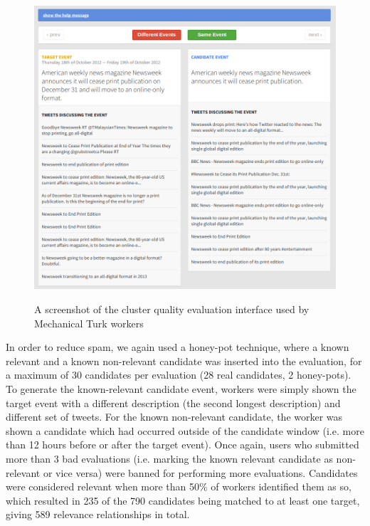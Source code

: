 \begin{figure}[t]
	{\includegraphics[width=\textwidth]{./Chapters/Collection/images/cluster_eval}}
	\caption{A screenshot of the cluster quality evaluation interface used by Mechanical Turk workers}
	\label{fig:clusteringscreenshot}
\end{figure}

In order to reduce spam, we again used a honey-pot technique, where a known relevant and a known non-relevant candidate was inserted into the evaluation, for a maximum of 30 candidates per evaluation (28 real candidates, 2 honey-pots).
To generate the known-relevant candidate event, workers were simply shown the target event with a different description (the second longest description) and different set of tweets.
For the known non-relevant candidate, the worker was shown a candidate which had occurred outside of the candidate window (i.e. more than 12 hours before or after the target event).
Once again, users who submitted more than 3 bad evaluations (i.e. marking the known relevant candidate as non-relevant or vice versa) were banned for performing more evaluations.
Candidates were considered relevant when more than 50\% of workers identified them as so, which resulted in 235 of the 790 candidates being matched to at least one target, giving 589 relevance relationships in total.